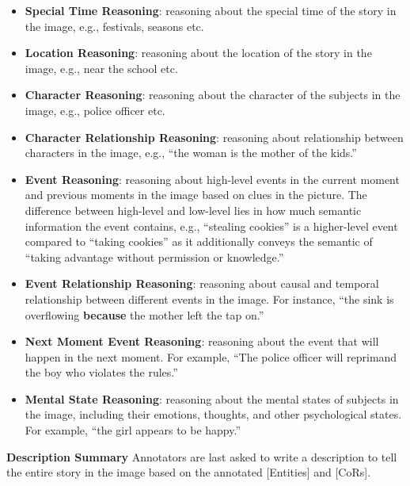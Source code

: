 \begin{itemize}
  \item \textbf{Special Time Reasoning}: reasoning about the special time of the story in the image, e.g., festivals, seasons etc.
  \item \textbf{Location Reasoning}: reasoning about the location of the story in the image, e.g., near the school etc.
  \item \textbf{Character Reasoning}: reasoning about the character of the subjects in the image, e.g., police officer etc.
  \item \textbf{Character Relationship Reasoning}: reasoning about relationship between characters in the image, e.g., ``the woman is the mother of the kids.''
  \item \textbf{Event Reasoning}: reasoning about high-level events in the current moment and previous moments in the image based on clues in the picture. The difference between high-level and low-level lies in how much semantic information the event contains, e.g., ``stealing cookies'' is a higher-level event compared to ``taking cookies'' as it additionally conveys the semantic of ``taking advantage without permission or knowledge.''
  
  \item \textbf{Event Relationship Reasoning}: reasoning about causal and temporal relationship between different events in the image. For instance, ``the sink is overflowing \textbf{because} the mother left the tap on.'' 
  \item \textbf{Next Moment Event Reasoning}: reasoning about the event that will happen in the next moment. For example, ``The police officer will reprimand the boy who violates the rules.''
  \item \textbf{Mental State Reasoning}: reasoning about the mental states of subjects in the image, including their emotions, thoughts, and other psychological states. For example, ``the girl appears to be happy.''
\end{itemize}

\noindent\textbf{Description Summary} Annotators are last asked to write a description to tell the entire story in the image based on the annotated [Entities] and [CoRs].

